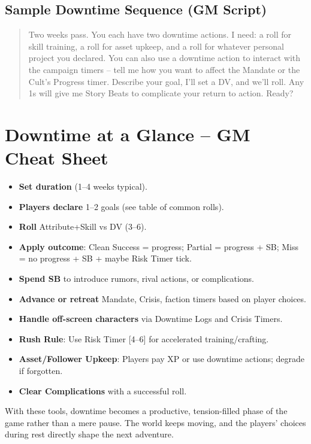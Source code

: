 \subsection{Sample Downtime Sequence (GM Script)}
\begin{quote}
\textquotedbl Two weeks pass. You each have two downtime actions. I need: a roll for skill training, a roll for asset upkeep, and a roll for whatever personal project you declared. You can also use a downtime action to interact with the campaign timers -- tell me how you want to affect the Mandate or the Cult's Progress timer. Describe your goal, I'll set a DV, and we'll roll. Any 1s will give me Story Beats to complicate your return to action. Ready?\textquotedbl
\end{quote}


\section{Downtime at a Glance -- GM Cheat Sheet}
\label{sec:downtime-cheat-sheet}

\begin{tcolorbox}[colback=blue!5!white, colframe=blue!75!black, title=Downtime Quick Reference,breakable]
\begin{itemize}
\item \textbf{Set duration} (1--4 weeks typical).
\item \textbf{Players declare} 1--2 goals (see table of common rolls).
\item \textbf{Roll} Attribute+Skill vs DV (3--6).
\item \textbf{Apply outcome}: Clean Success = progress; Partial = progress + SB; Miss = no progress + SB + maybe Risk Timer tick.
\item \textbf{Spend SB} to introduce rumors, rival actions, or complications.
\item \textbf{Advance or retreat} Mandate, Crisis, faction timers based on player choices.
\item \textbf{Handle off-screen characters} via Downtime Logs and Crisis Timers.
\item \textbf{Rush Rule}: Use Risk Timer [4--6] for accelerated training/crafting.
\item \textbf{Asset/Follower Upkeep}: Players pay XP or use downtime actions; degrade if forgotten.
\item \textbf{Clear Complications} with a successful roll.
\end{itemize}
\end{tcolorbox}

\noindent With these tools, downtime becomes a productive, tension-filled phase of the game rather than a mere pause. The world keeps moving, and the players' choices during rest directly shape the next adventure.